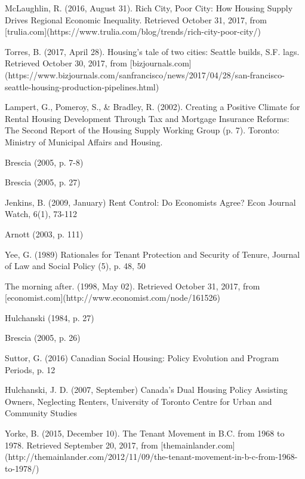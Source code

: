 \begin{thebibliography}{9}
  McLaughlin, R. (2016, August 31). Rich City, Poor City: How Housing Supply Drives Regional Economic Inequality. Retrieved October 31, 2017, from [trulia.com](https://www.trulia.com/blog/trends/rich-city-poor-city/)

   Torres, B. (2017, April 28). Housing’s tale of two cities: Seattle builds, S.F. lags. Retrieved October 30, 2017, from [bizjournals.com](https://www.bizjournals.com/sanfrancisco/news/2017/04/28/san-francisco-seattle-housing-production-pipelines.html)

  Lampert, G., Pomeroy, S., \& Bradley, R. (2002). Creating a Positive Climate for Rental Housing Development Through Tax and Mortgage Insurance Reforms: The Second Report of the Housing Supply Working Group (p. 7). Toronto: Ministry of Municipal Affairs and Housing.

  Brescia (2005, p. 7-8)

   Brescia (2005, p. 27)

  Jenkins, B. (2009, January) Rent Control: Do Economists Agree? Econ Journal Watch, 6(1), 73-112

  Arnott (2003, p. 111)

  Yee, G. (1989) Rationales for Tenant Protection and Security of Tenure, Journal of Law and Social Policy (5), p. 48, 50

   The morning after. (1998, May 02). Retrieved October 31, 2017, from [economist.com](http://www.economist.com/node/161526)

  Hulchanski (1984, p. 27)

  Brescia (2005, p. 26)

  Suttor, G. (2016) Canadian Social Housing: Policy Evolution and Program Periods, p. 12

  Hulchanski, J. D. (2007, September) Canada’s Dual Housing Policy Assisting Owners, Neglecting Renters, University of Toronto Centre for Urban and Community Studies

  Yorke, B. (2015, December 10). The Tenant Movement in B.C. from 1968 to 1978. Retrieved September 20, 2017, from [themainlander.com](http://themainlander.com/2012/11/09/the-tenant-movement-in-b-c-from-1968-to-1978/)


\end{thebibliography}
